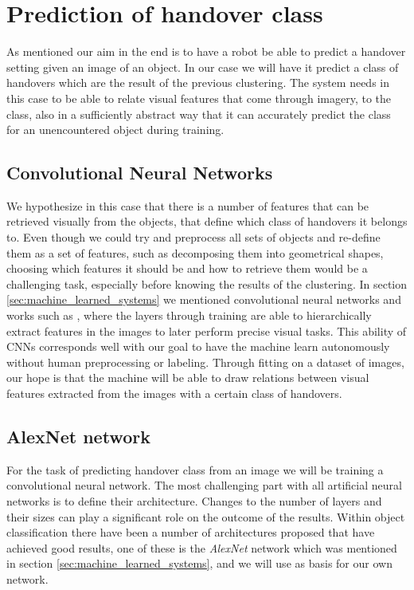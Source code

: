 %
%


\section{Prediction of handover class}

As mentioned our aim in the end is to have a robot be able to predict a handover setting given an image of an object. In our case we will have it predict a class of handovers which are the result of the previous clustering. The system needs in this case to be able to relate visual features that come through imagery, to the class, also in a sufficiently abstract way that it can accurately predict the class for an unencountered object during training.

\subsection{Convolutional Neural Networks}

We hypothesize in this case that there is a number of features that can be retrieved visually from the objects, that define which class of handovers it belongs to. Even though we could try and preprocess all sets of objects and re-define them as a set of features, such as decomposing them into geometrical shapes, choosing which features it should be and how to retrieve them would be a challenging task, especially before knowing the results of the clustering. In section \ref{sec:machine_learned_systems} we mentioned convolutional neural networks and works such as \parencite{Lee2009}, \parencite{Turaga2010} where the layers through training are able to hierarchically extract features in the images to later perform precise visual tasks. This ability of CNNs corresponds well with our goal to have the machine learn autonomously without human preprocessing or labeling. Through fitting on a dataset of images, our hope is that the machine will be able to draw relations between visual features extracted from the images with a certain class of handovers.

\subsection{AlexNet network}

For the task of predicting handover class from an image we will be training a convolutional neural network. The most challenging part with all artificial neural networks is to define their architecture. Changes to the number of layers and their sizes can play a significant role on the outcome of the results. Within object classification there have been a number of architectures proposed that have achieved good results, one of these is the \emph{AlexNet} network which was mentioned in section \ref{sec:machine_learned_systems}, and we will use as basis for our own network.

